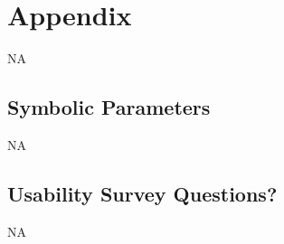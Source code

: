 \documentclass[12pt, titlepage]{article}
\begin{document}




\newpage

\section{Appendix}

NA

\subsection{Symbolic Parameters}

NA

\subsection{Usability Survey Questions?}

NA
\end{document}
